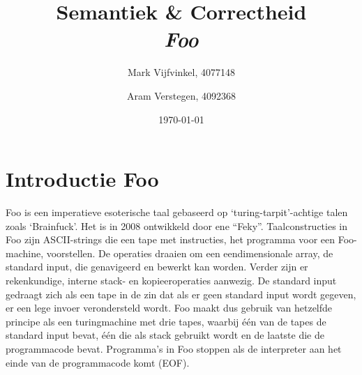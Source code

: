 \documentclass[11pt]{article}
\title{\textbf{Semantiek \& Correctheid \\ \emph{Foo}}}
\author{
	Mark Vijfvinkel, 4077148
	\and Aram Verstegen, 4092368
}
\date{\today}
\begin{document}
\maketitle


\section{Introductie Foo}

Foo is een imperatieve esoterische taal gebaseerd op `turing-tarpit'-achtige talen zoals `Brainfuck'. Het is in 2008 ontwikkeld door ene ``Feky''.
Taalconstructies in Foo zijn ASCII-strings die een tape met instructies, het programma voor een Foo-machine, voorstellen.
De operaties draaien om een eendimensionale array, de standard input, die genavigeerd en bewerkt kan worden.
Verder zijn er rekenkundige, interne stack- en kopieeroperaties aanwezig.
De standard input gedraagt zich als een tape in de zin dat als er geen standard input wordt gegeven, er een lege invoer verondersteld wordt. 
Foo maakt dus gebruik van hetzelfde principe als een turingmachine met drie tapes, waarbij \'e\'en van de tapes de standard input bevat, \'e\'en die als stack gebruikt wordt en de laatste die de programmacode bevat. %
Programma's in Foo stoppen als de interpreter aan het einde van de programmacode komt (EOF).
\end{document}
